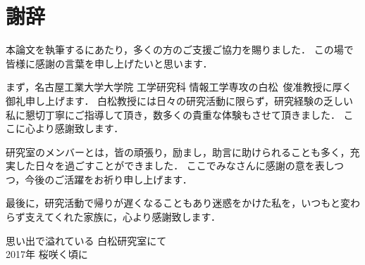 \chapter*{謝辞}
本論文を執筆するにあたり，多くの方のご支援ご協力を賜りました．
この場で皆様に感謝の言葉を申し上げたいと思います．

まず，名古屋工業大学大学院 工学研究科 情報工学専攻の白松~俊准教授に厚く御礼申し上げます．
白松教授には日々の研究活動に限らず，研究経験の乏しい私に懇切丁寧にご指導して頂き，数多くの貴重な体験もさせて頂きました．
ここに心より感謝致します．

研究室のメンバーとは，皆の頑張り，励まし，助言に助けられることも多く，充実した日々を過ごすことができました．
ここでみなさんに感謝の意を表しつつ，今後のご活躍をお祈り申し上げます．

最後に，研究活動で帰りが遅くなることもあり迷惑をかけた私を，いつもと変わらず支えてくれた家族に，心より感謝致します．

\vspace*{4.5mm}

\begin{flushright}
思い出で溢れている 白松研究室にて \\
2017年 桜咲く頃に \\
\vspace*{1.8mm}
\end{flushright}
